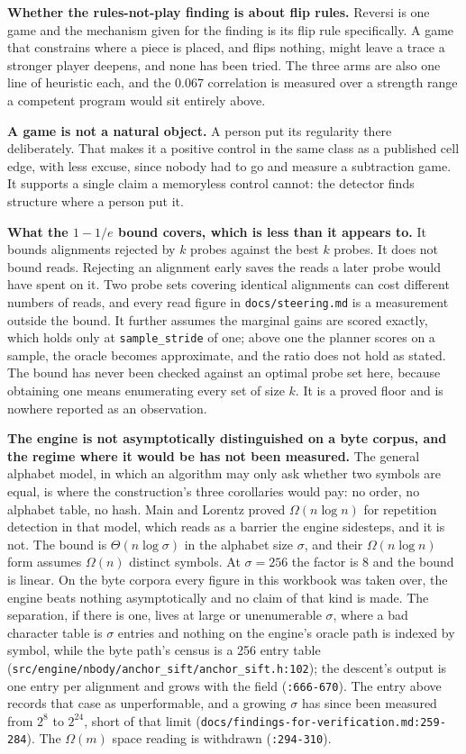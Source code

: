\textbf{Whether the rules-not-play finding is about flip rules.} Reversi is one game and the mechanism given for the finding is its flip rule specifically. A game that constrains where a piece is placed, and flips nothing, might leave a trace a stronger player deepens, and none has been tried. The three arms are also one line of heuristic each, and the 0.067 correlation is measured over a strength range a competent program would sit entirely above.

\textbf{A game is not a natural object.} A person put its regularity there deliberately. That makes it a positive control in the same class as a published cell edge, with less excuse, since nobody had to go and measure a subtraction game. It supports a single claim a memoryless control cannot: the detector finds structure where a person put it.

\textbf{What the \(1 - 1/e\) bound covers, which is less than it appears to.} It bounds alignments rejected by \(k\) probes against the best \(k\) probes. It does not bound reads. Rejecting an alignment early saves the reads a later probe would have spent on it. Two probe sets covering identical alignments can cost different numbers of reads, and every read figure in \texttt{docs/\allowbreak{}steering.md} is a measurement outside the bound. It further assumes the marginal gains are scored exactly, which holds only at \texttt{sample\_stride} of one; above one the planner scores on a sample, the oracle becomes approximate, and the ratio does not hold as stated. The bound has never been checked against an optimal probe set here, because obtaining one means enumerating every set of size \(k\). It is a proved floor and is nowhere reported as an observation.

\textbf{The engine is not asymptotically distinguished on a byte corpus, and the regime where it would be has not been measured.} The general alphabet model, in which an algorithm may only ask whether two symbols are equal, is where the construction's three corollaries would pay: no order, no alphabet table, no hash. Main and Lorentz proved \(\Omega(n \log n)\) for repetition detection in that model, which reads as a barrier the engine sidesteps, and it is not. The bound is \(\Theta(n \log \sigma)\) in the alphabet size \(\sigma\), and their \(\Omega(n \log n)\) form assumes \(\Omega(n)\) distinct symbols. At \(\sigma = 256\) the factor is 8 and the bound is linear. On the byte corpora every figure in this workbook was taken over, the engine beats nothing asymptotically and no claim of that kind is made. The separation, if there is one, lives at large or unenumerable \(\sigma\), where a bad character table is \(\sigma\) entries and nothing on the engine's oracle path is indexed by symbol, while the byte path's census is a 256 entry table (\texttt{src/\allowbreak{}engine/\allowbreak{}nbody/\allowbreak{}anchor\_sift/\allowbreak{}anchor\_sift.h:102}); the descent's output is one entry per alignment and grows with the field (\texttt{:666-670}). The entry above records that case as unperformable, and a growing \(\sigma\) has since been measured from \(2^8\) to \(2^{24}\), short of that limit (\texttt{docs/\allowbreak{}findings-\allowbreak{}for-\allowbreak{}verification.md:259-284}). The \(\Omega(m)\) space reading is withdrawn (\texttt{:294-310}).

